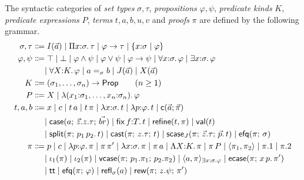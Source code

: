 \begin{definition}
\label{def:syntax}
The syntactic categories of \emph{set types} $\sigma, \tau$,
\emph{propositions} $\varphi, \psi$, \emph{predicate kinds} $K$,
\emph{predicate expressions} $P$, \emph{terms} $t, a, b, u, v$ and
\emph{proofs} $\pi$ are defined by the following grammar.
\begin{align*}
  \sigma, \tau &\Coloneqq
    I(\tup{a})
    \mid \Pi x{:}\sigma.\,\tau
    \mid \varphi \to \tau
    \mid \refty{x{:}\sigma}{\varphi}
  \\
  \varphi, \psi &\Coloneqq
    \top \mid \bot
    \mid \varphi \wedge \psi
    \mid \varphi \vee \psi
    \mid \varphi \to \psi
    \mid \forall x{:}\sigma.\,\varphi
    \mid \exists x{:}\sigma.\,\varphi
  \\ &\mathrel{\phantom{\Coloneqq}}
    \mid \forall X{:}K.\,\varphi
    \mid a =_{\sigma} b
    \mid J(\tup{a})
    \mid X(\tup{a})
  \\
  K &\Coloneqq (\sigma_1, \dots, \sigma_n) \to \Prop \qquad (n \geq 1)
  \\
  P &\Coloneqq X \mid \lambda(x_1{:}\sigma_1, \dots, x_n{:}\sigma_n).\,\varphi
  \\
  t, a, b &\Coloneqq
    x
    \mid c
    \mid t\,a
    \mid t\,\pi
    \mid \lambda x{:}\sigma.\,t
    \mid \lambda p{:}\varphi.\,t
    \mid \wcns{c}(\tup{a}; \tup{\pi})
  \\ &\mathrel{\phantom{\Coloneqq}}
    \mid \tcase{a}{\tup{z}.z.\tau}{\tup{br}}
    \mid \tfix\,f{:}T.\,t
    \mid \trefine{t}{\pi}
    \mid \tval{t}
  \\ &\mathrel{\phantom{\Coloneqq}}
    \mid \tsplit{\pi}{p_1\,p_2.\,t}
    \mid \tcast{\pi}{z.\tau}{t}
    \mid \tscase{J}{\pi}{\tup{z}.\tau}{\tup{p}.\,t}
    \mid \texfalso{\pi}{\sigma}
  \\
  \pi &\Coloneqq
    p
    \mid c
    \mid \lambda p{:}\varphi.\,\pi
    \mid \pi\,\pi'
    \mid \lambda x{:}\sigma.\,\pi
    \mid \pi\,a
    \mid \Lambda X{:}K.\,\pi
    \mid \pi\,P
    \mid \langle \pi_1, \pi_2 \rangle
    \mid \pi.1
    \mid \pi.2
  \\ &\mathrel{\phantom{\Coloneqq}}
    \mid \iota_1(\pi) \mid \iota_2(\pi)
    \mid \mathsf{vcase}(\pi;\, p_1.\pi_1;\, p_2.\pi_2)
    \mid \langle a, \pi \rangle_{\exists x{:}\sigma.\varphi}
    \mid \mathsf{ecase}(\pi;\, x\,p.\,\pi')
  \\ &\mathrel{\phantom{\Coloneqq}}
    \mid \mathsf{tt}
    \mid \texfalso{\pi}{\varphi}
    \mid \mathsf{refl}_{\sigma}(a)
    \mid \mathsf{rew}(\pi;\, z.\psi;\, \pi')

\end{align*}
\end{definition}
